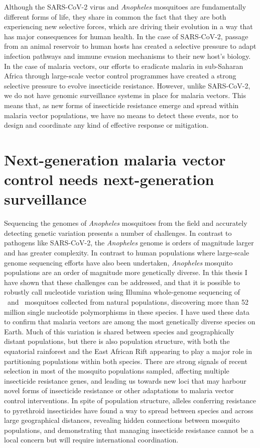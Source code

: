 \begin{refsection}
Although the SARS-CoV-2 virus and \textit{Anopheles} mosquitoes are fundamentally different forms of life, they share in common the fact that they are both experiencing new selective forces, which are driving their evolution in a way that has major consequences for human health.
%
In the case of SARS-CoV-2, passage from an animal reservoir to human hosts has created a selective pressure to adapt infection pathways and immune evasion mechanisms to their new host's biology.
%
In the case of malaria vectors, our efforts to eradicate malaria in sub-Saharan Africa through large-scale vector control programmes have created a strong selective pressure to evolve insecticide resistance.
%
However, unlike SARS-CoV-2, we do not have genomic surveillance systems in place for malaria vectors.
%
This means that, as new forms of insecticide resistance emerge and spread within malaria vector populations, we have no means to detect these events, nor to design and coordinate any kind of effective response or mitigation.


\section{Next-generation malaria vector control needs next-generation surveillance}\label{sec:discuss-nextgen}


Sequencing the genomes of \textit{Anopheles} mosquitoes from the field and accurately detecting genetic variation presents a number of challenges.
%
In contrast to pathogens like SARS-CoV-2, the \textit{Anopheles} genome is orders of magnitude larger and has greater complexity.
%
In contrast to human populations where large-scale genome sequencing efforts have also been undertaken, \textit{Anopheles} mosquito populations are an order of magnitude more genetically diverse.
%
In this thesis I have shown that these challenges can be addressed, and that it is possible to robustly call nucleotide variation using Illumina whole-genome sequencing of \agam\ and \acol\ mosquitoes collected from natural populations, discovering more than 52 million single nucleotide polymorphisms in these species.
%
I have used these data to confirm that malaria vectors are among the most genetically diverse species on Earth.
%
Much of this variation is shared between species and geographically distant populations, but there is also population structure, with both the equatorial rainforest and the East African Rift appearing to play a major role in partitioning populations within both species.
%
There are strong signals of recent selection in most of the mosquito populations sampled, affecting multiple insecticide resistance genes, and leading us towards new loci that may harbour novel forms of insecticide resistance or other adaptations to malaria vector control interventions.
%
In spite of population structure, alleles conferring resistance to pyrethroid insecticides have found a way to spread between species and across large geographical distances, revealing hidden connections between mosquito populations, and demonstrating that managing insecticide resistance cannot be a local concern but will require international coordination.



\end{refsection}
